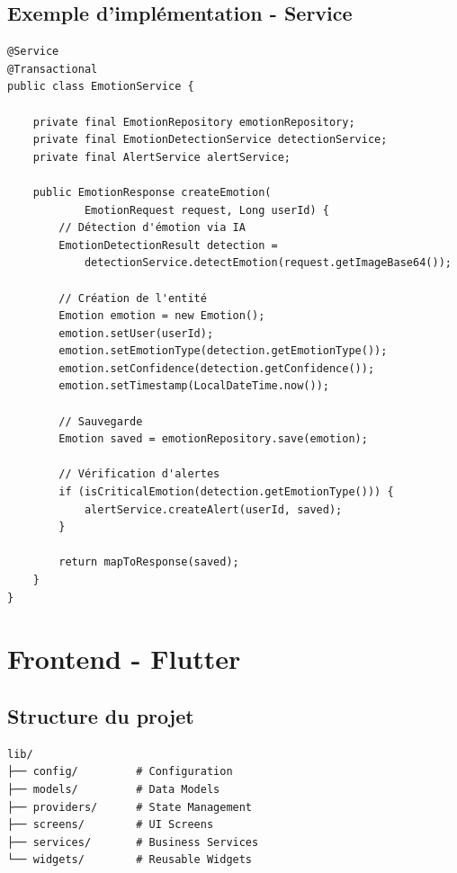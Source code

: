 \documentclass[a4paper,11pt]{report}
\begin{document}
\subsection{Exemple d'implémentation - Service}

\begin{lstlisting}[style=java, caption=Exemple de Service avec logique métier]
@Service
@Transactional
public class EmotionService {
    
    private final EmotionRepository emotionRepository;
    private final EmotionDetectionService detectionService;
    private final AlertService alertService;
    
    public EmotionResponse createEmotion(
            EmotionRequest request, Long userId) {
        // Détection d'émotion via IA
        EmotionDetectionResult detection = 
            detectionService.detectEmotion(request.getImageBase64());
        
        // Création de l'entité
        Emotion emotion = new Emotion();
        emotion.setUser(userId);
        emotion.setEmotionType(detection.getEmotionType());
        emotion.setConfidence(detection.getConfidence());
        emotion.setTimestamp(LocalDateTime.now());
        
        // Sauvegarde
        Emotion saved = emotionRepository.save(emotion);
        
        // Vérification d'alertes
        if (isCriticalEmotion(detection.getEmotionType())) {
            alertService.createAlert(userId, saved);
        }
        
        return mapToResponse(saved);
    }
}
\end{lstlisting}

\section{Frontend - Flutter}

\subsection{Structure du projet}

\begin{lstlisting}[style=dart, caption=Structure du projet Flutter]
lib/
├── config/         # Configuration
├── models/         # Data Models
├── providers/      # State Management
├── screens/        # UI Screens
├── services/       # Business Services
└── widgets/        # Reusable Widgets
\end{lstlisting}
\end{document}

